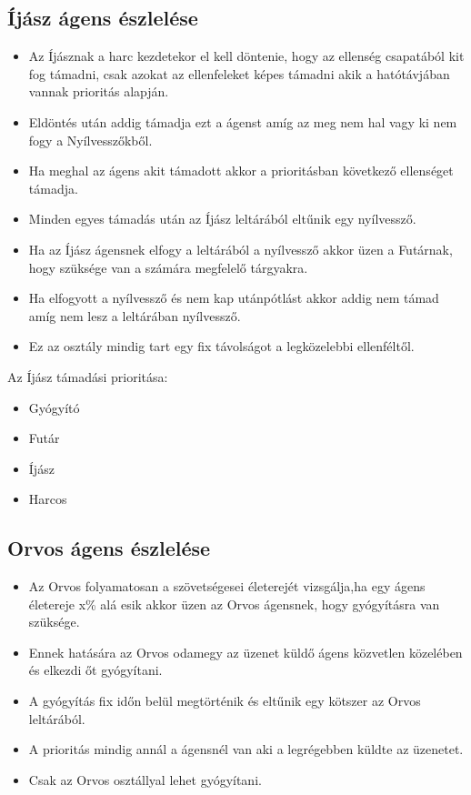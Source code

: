 \subsection{Íjász ágens észlelése}

\begin{itemize}
  \item Az Íjásznak a harc kezdetekor el kell döntenie, hogy az ellenség csapatából kit fog támadni, csak azokat az ellenfeleket képes támadni akik a hatótávjában vannak prioritás alapján.
  \item Eldöntés után addig támadja ezt a ágenst amíg az meg nem hal vagy ki nem fogy a Nyílvesszőkből.
  \item Ha meghal az ágens akit támadott akkor a prioritásban következő ellenséget támadja.
  \item Minden egyes támadás után az Íjász leltárából eltűnik egy nyílvessző.
  \item Ha az Íjász ágensnek elfogy a leltárából a nyílvessző akkor üzen a Futárnak, hogy szüksége van a számára megfelelő tárgyakra.
  \item Ha elfogyott a nyílvessző és nem kap utánpótlást akkor addig nem támad amíg nem lesz a leltárában nyílvessző.
  \item Ez az osztály mindig tart egy fix távolságot a legközelebbi ellenféltől.
\end{itemize}

Az Íjász támadási prioritása:

\begin{itemize}
  \item Gyógyító
  \item Futár
  \item Íjász
  \item Harcos
\end{itemize}

\subsection{Orvos ágens észlelése}

\begin{itemize}
  \item Az Orvos folyamatosan a szövetségesei életerejét vizsgálja,ha egy ágens életereje x\% alá esik akkor üzen az Orvos ágensnek, hogy gyógyításra van szüksége.
  \item Ennek hatására az Orvos odamegy az üzenet küldő ágens közvetlen közelében és elkezdi őt gyógyítani.
  \item A gyógyítás fix időn belül megtörténik és eltűnik egy kötszer az Orvos leltárából.
  \item A prioritás mindig annál a ágensnél van aki a legrégebben küldte az üzenetet.
  \item Csak az Orvos osztállyal lehet gyógyítani.
\end{itemize}


